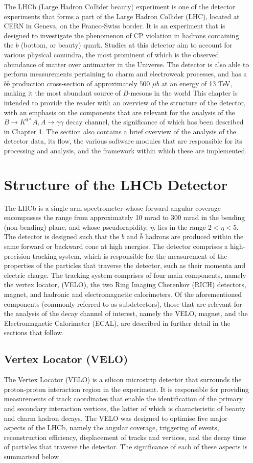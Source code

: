 The LHCb (Large Hadron Collider beauty) experiment is one of the detector experiments that forms a part of the Large Hadron Collider (LHC), located at CERN in Geneva, on the Franco-Swiss border. It is an experiment that is designed to 
investigate the phenomenon of CP violation in hadrons containing the $b$ (bottom, or beauty) quark. Studies at this detector aim to account for various physical conundra, the most prominent of which is the observed abundance of matter over
antimatter in the Universe. The detector is also able to perform measurements pertaining to charm and electroweak processes, and has a $b\bar{b}$ production cross-section of approximately 500 $\mu b$ at an energy of 13 TeV, making it the most abundant source of $B$-mesons in the world  This chapter is intended to provide the reader with an overview of the structure of the detector, with an emphasis on the 
components that are relevant for the analysis of the $B\rightarrow K^{0*}A, A\rightarrow\gamma\gamma$ decay channel, the significance of which has been described in Chapter 1. The section also contains a brief overview of the analysis of the detector data, its flow, the various
software modules that are responsible for its processing and analysis, and the framework within which these are implemented.
\section{Structure of the LHCb Detector}
The LHCb is a single-arm spectrometer whose forward angular coverage encompasses the range from approximately 10 mrad to 300 mrad in the bending (non-bending) plane, and whose pseudorapidity, $\eta$, lies in the range $2 < \eta < 5$.
The detector is designed such that the $b$ and $\bar{b}$ hadrons are produced within the same forward or backward cone at high energies. The detector comprises a high-precision tracking system, which is responsible for the measurement of the properties of the particles that traverse the
detector, such as their momenta and electric charge. The tracking system comprises of four main components, namely the vertex locator, (VELO), the two Ring Imaging Cherenkov (RICH) detectors, magnet, and hadronic and electromagnetic calorimeters. Of the aforementioned components (commonly referred to as subdetectors), those that are relevant for the
analysis of the decay channel of interest, namely the VELO, magnet, and the Electromagnetic Calorimeter (ECAL), are described in further detail in the sections that follow.
\subsection{Vertex Locator (VELO)}
The Vertex Locator (VELO) is a silicon microstrip detector that surrounds the proton-proton interaction region in the experiment. It is responsible for providing 
measurements of track coordinates that enable the identification of the primary and secondary interaction vertices, the latter of which is characteristic of beauty and charm 
hadron decays. The VELO was designed to optimise five major aspects of the LHCb, namely the angular coverage, triggering of events, reconstruction efficiency, displacement of tracks and vertices, and the decay time of
particles that traverse the detector. The significance of each of these aspects is summarised below
